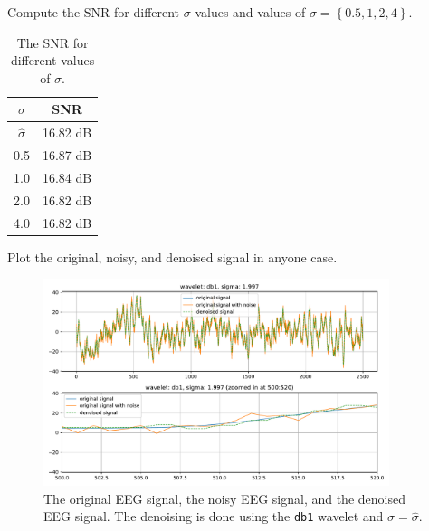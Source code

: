 \begin{tcolorbox}[colback=blue!5!white,colframe=blue!75!black,title=Problem 3.a]
    Compute the SNR for different $\sigma$ values and values of $\sigma = \left \lbrace 0.5, 1, 2, 4 \right \rbrace$.
\end{tcolorbox}


\begin{table}[H]
    \label{tbl:snr_values_for_different_sigmas}
    \centering

    \begin{tabular}{c|c}
        \hline
        $\sigma$ & SNR \\
        \hline
        
        $\hat{\sigma}$ & 16.82 dB \\
        0.5 & 16.87 dB \\
        1.0 & 16.84 dB \\
        2.0 & 16.82 dB \\
        4.0 & 16.82 dB \\

    \end{tabular}

    \caption{The SNR for different values of $\sigma$.}
\end{table}



\begin{tcolorbox}[colback=blue!5!white,colframe=blue!75!black,title=Problem 3.b]
    Plot the original, noisy, and denoised signal in anyone case.
\end{tcolorbox}


\begin{figure}[H]
    \label{fig:problem3b_plot1}
    \centering
    \includegraphics[width=0.9\textwidth]{./img/problem3-denoised-signal-wavelet-db1-sigma-1.997.pdf}
    \caption{The original EEG signal, the noisy EEG signal, and the denoised EEG signal. The denoising is done using the \texttt{db1} wavelet and $\sigma = \hat{\sigma}$.}
\end{figure}



